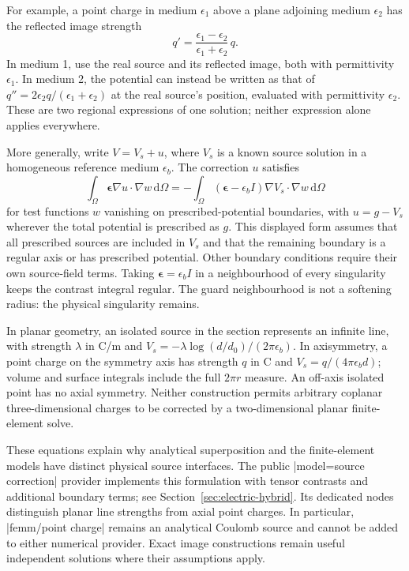 For example, a point charge in medium $\epsilon_1$ above a plane adjoining
medium $\epsilon_2$ has the reflected image strength
\[
 q'=\frac{\epsilon_1-\epsilon_2}{\epsilon_1+\epsilon_2}\,q.
\]
In medium 1, use the real source and its reflected image, both with
permittivity $\epsilon_1$. In medium 2, the potential can instead be written
as that of $q''=2\epsilon_2q/(\epsilon_1+\epsilon_2)$ at the real source's
position, evaluated with permittivity $\epsilon_2$. These are two regional
expressions of one solution; neither expression alone applies everywhere.

More generally, write $V=V_s+u$, where $V_s$ is a known source solution in a
homogeneous reference medium $\epsilon_b$. The correction $u$ satisfies
\[
 \int_\Omega \boldsymbol\epsilon\nabla u\mathbin\cdot\nabla w\,\mathrm d\Omega
 =-\int_\Omega(\boldsymbol\epsilon-\epsilon_b I)
        \nabla V_s\mathbin\cdot\nabla w\,\mathrm d\Omega
\]
for test functions $w$ vanishing on prescribed-potential boundaries, with
$u=g-V_s$ wherever the total potential is prescribed as $g$. This displayed
form assumes that all prescribed sources are included in $V_s$ and that the
remaining boundary is a regular axis or has prescribed potential. Other
boundary conditions require their own source-field terms. Taking
$\boldsymbol\epsilon=\epsilon_b I$ in a neighbourhood of every singularity
keeps the contrast integral regular. The guard neighbourhood is not a
softening radius: the physical singularity remains.

In planar geometry, an isolated source in the section represents an infinite
line, with strength $\lambda$ in C/m and
$V_s=-\lambda\log(d/d_0)/(2\pi\epsilon_b)$. In axisymmetry, a point charge on
the symmetry axis has strength $q$ in C and
$V_s=q/(4\pi\epsilon_b d)$; volume and surface integrals include the full
$2\pi r$ measure. An off-axis isolated point has no axial symmetry.
Neither construction permits arbitrary coplanar three-dimensional charges
to be corrected by a two-dimensional planar finite-element solve.

These equations explain why analytical superposition and the finite-element
models have distinct physical source interfaces. The public
|model=source correction| provider implements this formulation with tensor contrasts and
additional boundary terms; see Section~\ref{sec:electric-hybrid}. Its dedicated nodes
distinguish planar line strengths from axial point charges. In particular,
|femm/point charge| remains an analytical Coulomb source and cannot be added
to either numerical provider. Exact image constructions remain useful
independent solutions where their assumptions apply.

